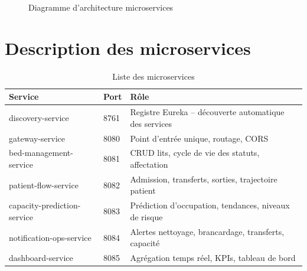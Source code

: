 \documentclass[12pt,a4paper]{report}
\begin{document}
\begin{figure}[H]
    \caption{Diagramme d'architecture microservices}
\end{figure}

\section{Description des microservices}

\begin{table}[H]
    \centering
    \begin{tabularx}{\textwidth}{llX}
        \toprule
        \textbf{Service} & \textbf{Port} & \textbf{R\^ole} \\
        \midrule
        discovery-service & 8761 & Registre Eureka -- d\'ecouverte automatique des services \\
        gateway-service & 8080 & Point d'entr\'ee unique, routage, CORS \\
        bed-management-service & 8081 & CRUD lits, cycle de vie des statuts, affectation \\
        patient-flow-service & 8082 & Admission, transferts, sorties, trajectoire patient \\
        capacity-prediction-service & 8083 & Pr\'ediction d'occupation, tendances, niveaux de risque \\
        notification-ops-service & 8084 & Alertes nettoyage, brancardage, transferts, capacit\'e \\
        dashboard-service & 8085 & Agr\'egation temps r\'eel, KPIs, tableau de bord \\
        \bottomrule
    \end{tabularx}
    \caption{Liste des microservices}
\end{table}
\end{document}
